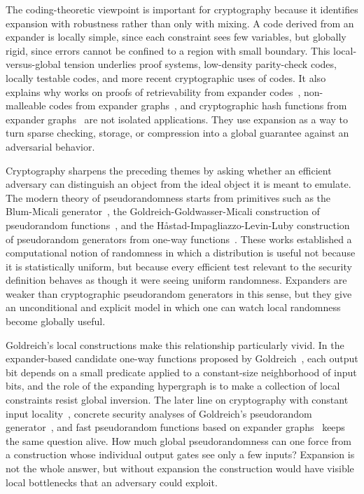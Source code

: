The coding-theoretic viewpoint is important for cryptography because it identifies expansion with robustness rather than only with mixing. A code derived from an expander is locally simple, since each constraint sees few variables, but globally rigid, since errors cannot be confined to a region with small boundary. This local-versus-global tension underlies proof systems, low-density parity-check codes, locally testable codes, and more recent cryptographic uses of codes. It also explains why works on proofs of retrievability from expander codes~\cite{EPRINT:HemOst16}, non-malleable codes from expander graphs~\cite{EPRINT:RasSah18}, and cryptographic hash functions from expander graphs~\cite{JC:ChaLauGor09} are not isolated applications. They use expansion as a way to turn sparse checking, storage, or compression into a global guarantee against an adversarial behavior.

 Cryptography sharpens the preceding themes by asking whether an efficient adversary can distinguish an object from the ideal object it is meant to emulate. The modern theory of pseudorandomness starts from primitives such as the Blum-Micali generator~\cite{BluMic84}, the Goldreich-Goldwasser-Micali construction of pseudorandom functions~\cite{GolGolMic86}, and the H{\aa}stad-Impagliazzo-Levin-Luby construction of pseudorandom generators from one-way functions~\cite{HILL99}. These works established a computational notion of randomness in which a distribution is useful not because it is statistically uniform, but because every efficient test relevant to the security definition behaves as though it were seeing uniform randomness. Expanders are weaker than cryptographic pseudorandom generators in this sense, but they give an unconditional and explicit model in which one can watch local randomness become globally useful.

Goldreich's local constructions make this relationship particularly vivid. In the expander-based candidate one-way functions proposed by Goldreich~\cite{EPRINT:Goldreich00b}, each output bit depends on a small predicate applied to a constant-size neighborhood of input bits, and the role of the expanding hypergraph is to make a collection of local constraints resist global inversion. The later line on cryptography with constant input locality~\cite{JC:AppIshKus09}, concrete security analyses of Goldreich's pseudorandom generator~\cite{EPRINT:CDMRR18}, and fast pseudorandom functions based on expander graphs~\cite{TCC:AppRay16b} keeps the same question alive. How much global pseudorandomness can one force from a construction whose individual output gates see only a few inputs? Expansion is not the whole answer, but without expansion the construction would have visible local bottlenecks that an adversary could exploit.

